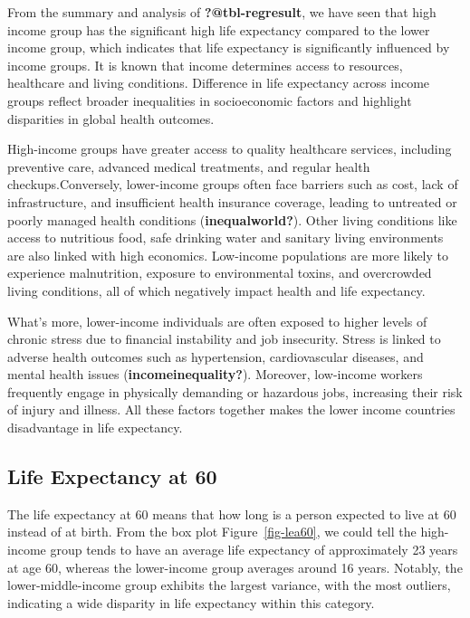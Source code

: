 \documentclass[
  letterpaper,
  DIV=11,
  numbers=noendperiod]{scrartcl}
\begin{document}
From the summary and analysis of \textbf{?@tbl-regresult}, we have seen
that high income group has the significant high life expectancy compared
to the lower income group, which indicates that life expectancy is
significantly influenced by income groups. It is known that income
determines access to resources, healthcare and living conditions.
Difference in life expectancy across income groups reflect broader
inequalities in socioeconomic factors and highlight disparities in
global health outcomes.

High-income groups have greater access to quality healthcare services,
including preventive care, advanced medical treatments, and regular
health checkups.Conversely, lower-income groups often face barriers such
as cost, lack of infrastructure, and insufficient health insurance
coverage, leading to untreated or poorly managed health conditions
(\textbf{inequalworld?}). Other living conditions like access to
nutritious food, safe drinking water and sanitary living environments
are also linked with high economics. Low-income populations are more
likely to experience malnutrition, exposure to environmental toxins, and
overcrowded living conditions, all of which negatively impact health and
life expectancy.

What's more, lower-income individuals are often exposed to higher levels
of chronic stress due to financial instability and job insecurity.
Stress is linked to adverse health outcomes such as hypertension,
cardiovascular diseases, and mental health issues
(\textbf{incomeinequality?}). Moreover, low-income workers frequently
engage in physically demanding or hazardous jobs, increasing their risk
of injury and illness. All these factors together makes the lower income
countries disadvantage in life expectancy.

\subsection{Life Expectancy at 60}\label{life-expectancy-at-60}

The life expectancy at 60 means that how long is a person expected to
live at 60 instead of at birth. From the box plot
Figure~\ref{fig-lea60}, we could tell the high-income group tends to
have an average life expectancy of approximately 23 years at age 60,
whereas the lower-income group averages around 16 years. Notably, the
lower-middle-income group exhibits the largest variance, with the most
outliers, indicating a wide disparity in life expectancy within this
category.
\end{document}
